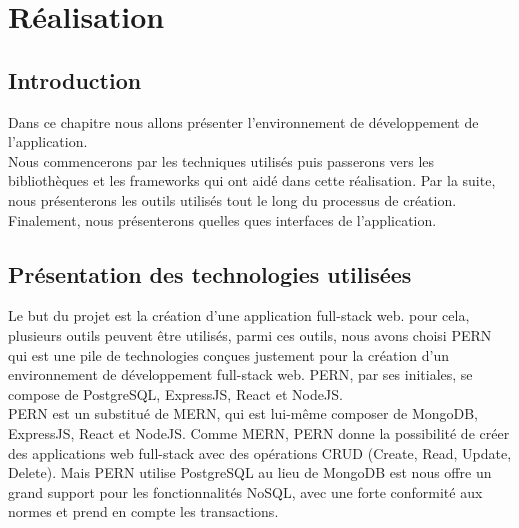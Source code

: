 \chapter{Réalisation}

\section{Introduction}
    Dans ce chapitre nous allons présenter l'environnement de développement de l'application.\\

    Nous commencerons par les techniques utilisés puis passerons vers les bibliothèques et les frameworks qui ont aidé dans cette réalisation. Par la suite, nous présenterons les outils utilisés tout le long du processus de création.\\

    Finalement, nous présenterons quelles ques interfaces de l'application.\\

\section{Présentation des technologies utilisées}
    Le but du projet est la création d'une application full-stack web. pour cela, plusieurs outils peuvent être utilisés, parmi ces outils, nous avons choisi \acs{PERN} qui est une pile de technologies conçues justement pour la création d'un environnement de développement full-stack web. \acs{PERN}, par ses initiales, se compose de PostgreSQL, ExpressJS, React et NodeJS.\\

    \acs{PERN} est un substitué de \acs{MERN}, qui est lui-même composer de MongoDB, ExpressJS, React et NodeJS. Comme \acs{MERN}, \acs{PERN} donne la possibilité de créer des applications web full-stack avec des opérations \acs{CRUD} (Create, Read, Update, Delete). Mais \acs{PERN} utilise PostgreSQL au lieu de MongoDB est nous offre un grand support pour les fonctionnalités NoSQL, avec une forte conformité aux normes et prend en compte les transactions.\\

